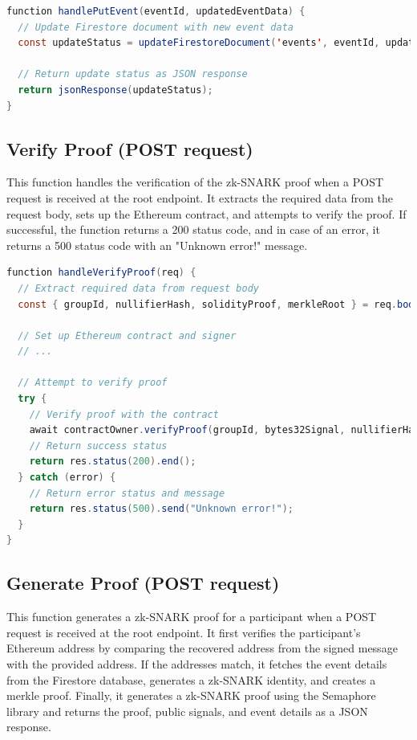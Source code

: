 \begin{lstlisting}[language=Java, name={Update Event Function}, label={sc:updateEvent}]
function handlePutEvent(eventId, updatedEventData) {
  // Update Firestore document with new event data
  const updateStatus = updateFirestoreDocument('events', eventId, updatedEventData);

  // Return update status as JSON response
  return jsonResponse(updateStatus);
}
\end{lstlisting}


\subsection{Verify Proof (POST request)}
This function handles the verification of the zk-SNARK proof when a POST request is received at the root endpoint. It extracts the required data from the request body, sets up the Ethereum contract, and attempts to verify the proof. If successful, the function returns a 200 status code, and in case of an error, it returns a 500 status code with an "Unknown error!" message.

\begin{lstlisting}[language=Java, name={Verify Proof Function}, label={sc:verifyProof}]
function handleVerifyProof(req) {
  // Extract required data from request body
  const { groupId, nullifierHash, solidityProof, merkleRoot } = req.body;

  // Set up Ethereum contract and signer
  // ...

  // Attempt to verify proof
  try {
    // Verify proof with the contract
    await contractOwner.verifyProof(groupId, bytes32Signal, nullifierHash, merkleRoot, solidityProof);
    // Return success status
    return res.status(200).end();
  } catch (error) {
    // Return error status and message
    return res.status(500).send("Unknown error!");
  }
}
\end{lstlisting}

\subsection{Generate Proof (POST request)}
This function generates a zk-SNARK proof for a participant when a POST request is received at the root endpoint. It first verifies the participant's Ethereum address by comparing the recovered address from the signed message with the provided address. If the addresses match, it fetches the event details from the Firestore database, generates a zk-SNARK identity, and creates a merkle proof. Finally, it generates a zk-SNARK proof using the Semaphore library and returns the proof, public signals, and event details as a JSON response.


